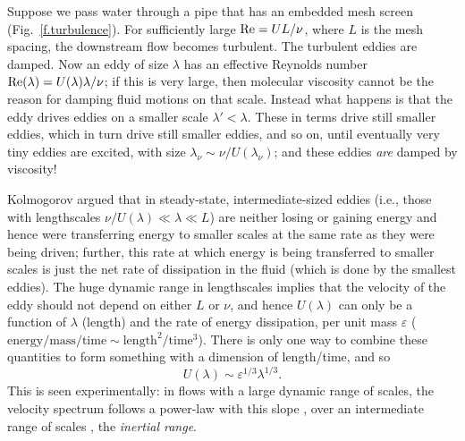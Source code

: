 Suppose we pass water through a pipe that has an embedded mesh screen (Fig.~\ref{f.turbulence}).  For sufficiently large $\mathrm{Re} = UL/\nu$, where $L$ is the mesh spacing, the downstream flow becomes turbulent. The turbulent eddies are damped.  Now an eddy of size $\lambda$ has an effective Reynolds number $\mathrm{Re}(\lambda) = U(\lambda)\lambda/\nu$; if this is very large, then molecular viscosity cannot be the reason for damping fluid motions on that scale. Instead what happens is that the eddy drives eddies on a smaller scale $\lambda' < \lambda$. These in terms drive still smaller eddies, which in turn drive still smaller eddies, and so on, until eventually very tiny eddies are excited, with size $\lambda_{\nu} \sim \nu/U(\lambda_{\nu})$; and these eddies \emph{are} damped by viscosity!

Kolmogorov argued that in steady-state, intermediate-sized eddies (i.e., those with lengthscales $\nu/U(\lambda) \ll \lambda \ll L$) are neither losing or gaining energy and hence were transferring energy to smaller scales at the same rate as they were being driven; further, this rate at which energy is being transferred to smaller scales is just the net rate of dissipation in the fluid (which is done by the smallest eddies).  The huge dynamic range in lengthscales implies that the velocity of the eddy should not depend on either $L$ or $\nu$, and hence $U(\lambda)$ can only be a function of $\lambda$ (length) and the rate of energy dissipation, per unit mass $\varepsilon$ ($\mathrm{energy/mass/time}\sim\mathrm{length^{2}/time^{3}}$). There is only one way to combine these quantities to form something with a dimension of length/time, and so
\begin{equation}\label{e.kolmogorov-velocity}
U(\lambda) \sim \varepsilon^{1/3}\lambda^{1/3}.
\end{equation}
This is seen experimentally: in flows with a large dynamic range of scales, the velocity spectrum follows a power-law with this slope \citep[see][]{Grant1962Turbulence-spec}, over an intermediate range of scales , the \emph{inertial range}.

